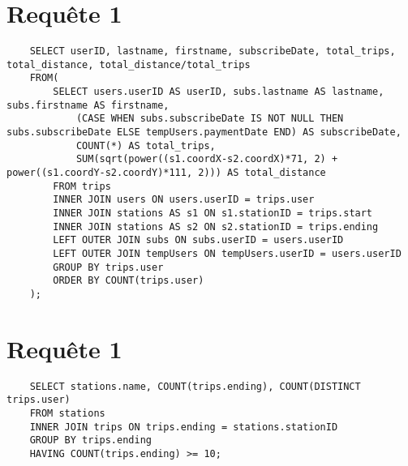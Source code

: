 \documentclass[a4paper,11pt]{article}
\begin{document}
\section{Requ\^ete 1}
    \begin{lstlisting}
    SELECT userID, lastname, firstname, subscribeDate, total_trips, total_distance, total_distance/total_trips
    FROM(
        SELECT users.userID AS userID, subs.lastname AS lastname, subs.firstname AS firstname,
            (CASE WHEN subs.subscribeDate IS NOT NULL THEN subs.subscribeDate ELSE tempUsers.paymentDate END) AS subscribeDate,
            COUNT(*) AS total_trips,
            SUM(sqrt(power((s1.coordX-s2.coordX)*71, 2) + power((s1.coordY-s2.coordY)*111, 2))) AS total_distance
        FROM trips
        INNER JOIN users ON users.userID = trips.user
        INNER JOIN stations AS s1 ON s1.stationID = trips.start
        INNER JOIN stations AS s2 ON s2.stationID = trips.ending
        LEFT OUTER JOIN subs ON subs.userID = users.userID
        LEFT OUTER JOIN tempUsers ON tempUsers.userID = users.userID
        GROUP BY trips.user
        ORDER BY COUNT(trips.user)
    );
    \end{lstlisting}


\section{Requ\^ete 1}
    \begin{lstlisting}
    SELECT stations.name, COUNT(trips.ending), COUNT(DISTINCT trips.user)
    FROM stations
    INNER JOIN trips ON trips.ending = stations.stationID
    GROUP BY trips.ending
    HAVING COUNT(trips.ending) >= 10;
    \end{lstlisting}
\end{document}
